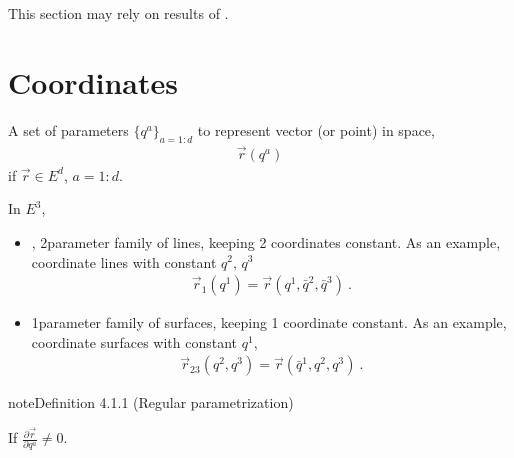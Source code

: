 \documentclass[letterpaper,10pt,english]{jupyterBook}
\begin{document}
\sphinxAtStartPar
This section may rely on results of {\hyperref[\detokenize{ch/differential-geometry/intro:differential-geometry-intro}]{}}.


\section{Coordinates}
\label{\detokenize{ch/tensor-algebra-calculus/calculus-euclidean:coordinates}}\label{\detokenize{ch/tensor-algebra-calculus/calculus-euclidean:tensor-calculus-coordinates}}
\sphinxAtStartPar
A set of parameters \(\{q^a\}_{a=1:d}\) to represent vector (or point) in space,
\begin{equation*}
\begin{split}\vec{r}(q^a)\end{split}
\end{equation*}
\sphinxAtStartPar
if \(\vec{r} \in E^{d}\), \(a=1:d\).

\sphinxAtStartPar
In \(E^3\),
\begin{itemize}
\item {} 
\sphinxAtStartPar
{}, 2\sphinxhyphen{}parameter family of lines, keeping 2 coordinates constant. As an example, coordinate lines with constant \(q^2, \, q^3\)
\begin{equation*}
\begin{split}\vec{r}_1(q^1) = \vec{r}(q^1, \bar{q}^2, \bar{q}^3) \ .\end{split}
\end{equation*}
\item {} 
\sphinxAtStartPar
{} 1\sphinxhyphen{}parameter family of surfaces, keeping 1 coordinate constant. As an example, coordinate surfaces with constant \(q^1\),
\begin{equation*}
\begin{split}\vec{r}_{23}(q^2, q^3) = \vec{r}(\bar{q}^1, q^2, q^3) \ .\end{split}
\end{equation*}
\end{itemize}
\label{ch/tensor-algebra-calculus/calculus-euclidean:definition-0}
\begin{sphinxadmonition}{note}{Definition 4.1.1 (Regular parametrization)}



\sphinxAtStartPar
If \(\frac{\partial \vec{r}}{\partial q^a} \ne 0\).
\end{sphinxadmonition}
\end{document}
